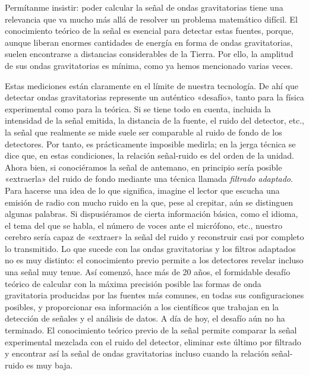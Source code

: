 Permítanme insistir: poder calcular la señal de ondas gravitatorias tiene una relevancia que va mucho más allá de resolver un problema matemático difícil. El conocimiento teórico de la señal es esencial para detectar estas fuentes, porque, aunque liberan enormes cantidades de energía en forma de ondas gravitatorias, suelen encontrarse a distancias considerables de la Tierra. Por ello, la amplitud de sus ondas gravitatorias es mínima, como ya hemos mencionado varias veces.

Estas mediciones están claramente en el límite de nuestra tecnología. De ahí que detectar ondas gravitatorias represente un auténtico «desafío», tanto para la física experimental como para la teórica. Si se tiene todo en cuenta, incluida la intensidad de la señal emitida, la distancia de la fuente, el ruido del detector, etc., la señal que realmente se mide suele ser comparable al ruido de fondo de los detectores. Por tanto, es prácticamente imposible medirla; en la jerga técnica se dice que, en estas condiciones, la relación señal-ruido es del orden de la unidad. Ahora bien, si conociéramos la señal de antemano, en principio sería posible «extraerla» del ruido de fondo mediante una técnica llamada \emph{filtrado adaptado}. Para hacerse una idea de lo que significa, imagine el lector que escucha una emisión de radio con mucho ruido en la que, pese al crepitar, aún se distinguen algunas palabras. Si dispusiéramos de cierta información básica, como el idioma, el tema del que se habla, el número de voces ante el micrófono, etc., nuestro cerebro sería capaz de «extraer» la señal del ruido y reconstruir casi por completo lo transmitido. Lo que sucede con las ondas gravitatorias y los filtros adaptados no es muy distinto: el conocimiento previo permite a los detectores revelar incluso una señal muy tenue. Así comenzó, hace más de 20 años, el formidable desafío teórico de calcular con la máxima precisión posible las formas de onda gravitatoria producidas por las fuentes más comunes, en todas sus configuraciones posibles, y proporcionar esa información a los científicos que trabajan en la detección de señales y el análisis de datos. A día de hoy, el desafío aún no ha terminado. El conocimiento teórico previo de la señal permite comparar la señal experimental mezclada con el ruido del detector, eliminar este último por filtrado y encontrar así la señal de ondas gravitatorias incluso cuando la relación señal-ruido es muy baja.

